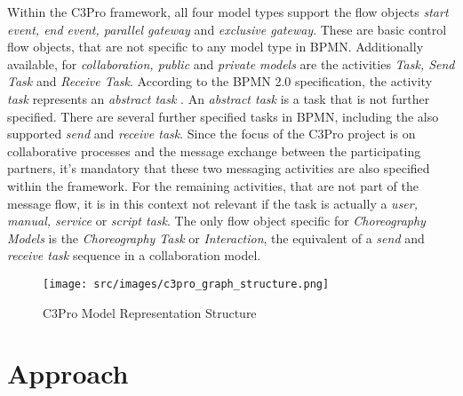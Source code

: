 Within the C3Pro framework, all four model types support the flow objects \textit{start event, end event, parallel gateway} and \textit{exclusive gateway}. These are basic control flow objects, that are not specific to any model type in BPMN. Additionally available, for \textit{collaboration, public} and \textit{private models} are the activities \textit{Task, Send Task} and \textit{Receive Task}. According to the BPMN 2.0 specification, the activity \textit{task} represents an \textit{abstract task} \cite{BPMN20}. An \textit{abstract task} is a task that is not further specified. There are several further specified tasks in BPMN, including the also supported \textit{send} and \textit{receive task}. Since the focus of the C3Pro project is on collaborative processes and the message exchange between the participating partners, it's mandatory that these two messaging activities are also specified within the framework. For the remaining activities, that are not part of the message flow, it is in this context not relevant if the task is actually a \textit{user, manual, service} or \textit{script task}. The only flow object specific for \textit{Choreography Models} is the \textit{Choreography Task} or \textit{Interaction}, the equivalent of a \textit{send} and \textit{receive task} sequence in a collaboration model.   

\begin{figure}[H]
\texttt{[image: src/images/c3pro\_graph\_structure.png]}
\caption{C3Pro Model Representation Structure}
\label{fig:choreo_structure}
\end{figure}

\section{Approach}

